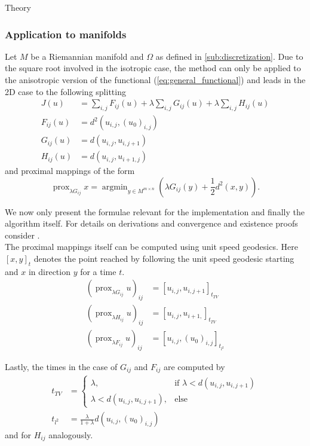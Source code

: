 \begin{chapter}{Theory}
\subsubsection{Application to manifolds} %
\label{ssub:Application to manifolds}
Let $M$ be a Riemannian manifold and $\Omega$ as defined in \ref{sub:discretization}. Due to the square root involved in the isotropic case,
the method can only be applied to the anisotropic version of the functional (\ref{eq:general_functional}) and leads in the 2D case to the following splitting
\begin{align}
    J(u)	&= \sum_{i,j}F_{ij}(u)+\lambda\sum_{i,j}G_{ij}(u)+\lambda\sum_{i,j}H_{ij}(u)\\
    F_{ij}(u)	&=  d^{2}(u_{i,j},(u_0)_{i,j})\\
    G_{ij}(u)	&=  d(u_{i,j},u_{i,j+1})\\
    H_{ij}(u)	&=  d(u_{i,j},u_{i+1,j})
\end{align}
and proximal mappings of the form
\begin{equation}
\label{eq:manifold_proximity}
\operatorname{prox}_{\lambda G_{ij}}x=\operatorname{argmin}_{y\in M^{m\times n}}\left(\lambda G_{ij}(y) +\frac{1}{2}d^2(x,y) \right).
\end{equation}

We now only present the formulae relevant for the implementation and finally the algorithm itself. For details on derivations and convergence and existence proofs consider \cite{Weinmann}.\\

The proximal mappings itself can be computed using unit speed geodesics. Here $[x,y]_t$ denotes the point reached by
following the unit speed geodesic starting and $x$ in direction $y$ for a time $t$.
\begin{align}
    (\operatorname{prox}_{\lambda G_{ij}}u)_{ij}&=[u_{i,j},u_{i,j+1}]_{t_{TV}} \\
    (\operatorname{prox}_{\lambda H_{ij}}u)_{ij}&=[u_{i,j},u_{i+1,}]_{t_{TV}} \\
    (\operatorname{prox}_{\lambda F_{ij}}u)_{ij}&=[u_{i,j},(u_0)_{i,j}]_{t_{l^2}}
\end{align}

Lastly, the times in the case of $G_{ij}$ and $F_{ij}$ are computed by
\begin{align}
    t_{TV}&=
    \begin{cases}
	\lambda, &\text{if } \lambda<d(u_{i,j},u_{i,j+1})\\
	\lambda<d(u_{i,j},u_{i,j+1}), & \text{else}
    \end{cases}\\
    t_{l^{2}}&=\frac{\lambda}{1+\lambda}d(u_{i,j},(u_0)_{i,j})
\end{align}
and for $H_{ij}$ analogously.\\


\end{chapter}

